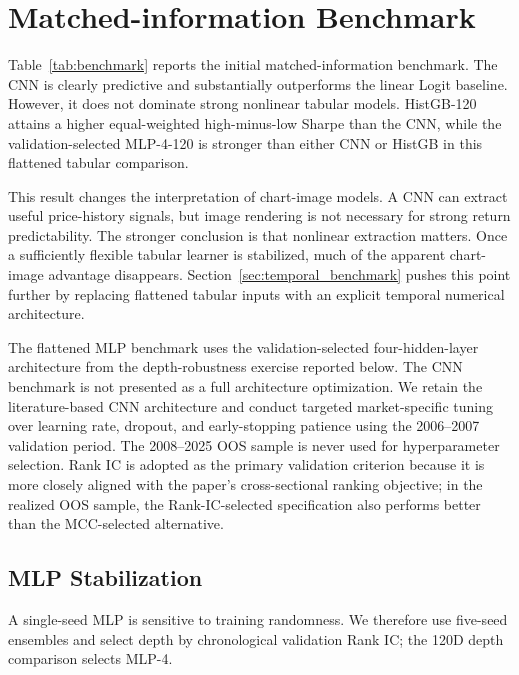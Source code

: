\section{Matched-information Benchmark}

Table~\ref{tab:benchmark} reports the initial matched-information benchmark. The CNN is clearly predictive and substantially outperforms the linear Logit baseline. However, it does not dominate strong nonlinear tabular models. HistGB-120 attains a higher equal-weighted high-minus-low Sharpe than the CNN, while the validation-selected MLP-4-120 is stronger than either CNN or HistGB in this flattened tabular comparison.



This result changes the interpretation of chart-image models. A CNN can extract useful price-history signals, but image rendering is not necessary for strong return predictability. The stronger conclusion is that nonlinear extraction matters. Once a sufficiently flexible tabular learner is stabilized, much of the apparent chart-image advantage disappears. Section~\ref{sec:temporal_benchmark} pushes this point further by replacing flattened tabular inputs with an explicit temporal numerical architecture.

The flattened MLP benchmark uses the validation-selected four-hidden-layer architecture from the depth-robustness exercise reported below. The CNN benchmark is not presented as a full architecture optimization. We retain the literature-based CNN architecture and conduct targeted market-specific tuning over learning rate, dropout, and early-stopping patience using the 2006--2007 validation period. The 2008--2025 OOS sample is never used for hyperparameter selection. Rank IC is adopted as the primary validation criterion because it is more closely aligned with the paper's cross-sectional ranking objective; in the realized OOS sample, the Rank-IC-selected specification also performs better than the MCC-selected alternative.

\subsection{MLP Stabilization}

A single-seed MLP is sensitive to training randomness. We therefore use five-seed ensembles and select depth by chronological validation Rank IC; the 120D depth comparison selects MLP-4.


